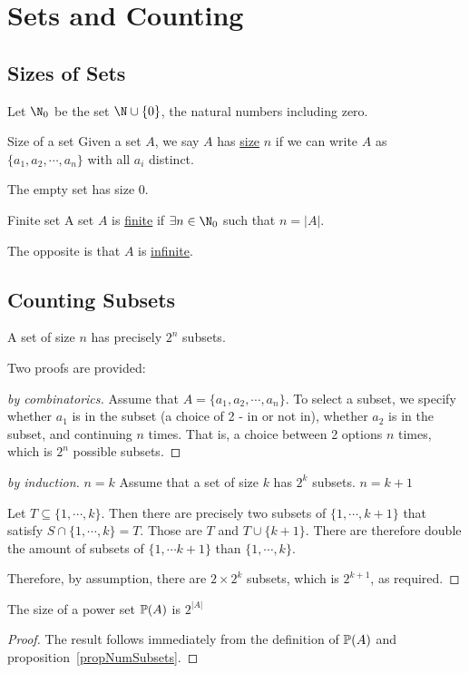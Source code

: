 \documentclass[../Main.tex]{subfiles}
\begin{document}
\section{Sets and Counting}
\subsection{Sizes of Sets}
Let $\N_0$ be the set $\N \cup \{0\}$, the natural numbers including zero.
\begin{definition}{Size of a set}
    Given a set $A$, we say $A$ has \underline{size} $n$ if we can write $A$ as $\{a_1, a_2, \cdots, a_n\}$ with all $a_i$ distinct.
\end{definition}
The empty set has size $0$.
\begin{definition}{Finite set}
    A set $A$ is \underline{finite} if $\exists n \in \N_0$ such that $n = |A|$.
\end{definition}
The opposite is that $A$ is \underline{infinite}.\par
\subsection{Counting Subsets}
\begin{proposition}
    A set of size $n$ has precisely $2^n$ subsets.
    \label{propNumSubsets}
\end{proposition}
Two proofs are provided:
\begin{proof}[by combinatorics]
    Assume that $A = \{a_1, a_2, \cdots, a_n\}$. To select a subset, we specify whether $a_1$ is in the subset (a choice of 2 - in or not in), whether $a_2$ is in the subset, and continuing $n$ times. That is, a choice between 2 options $n$ times, which is $2^n$ possible subsets.
\end{proof}
\begin{proof}[by induction]
    {$n=k$}{
        Assume that a set of size $k$ has $2^k$ subsets.
    }
    {$n = k + 1$}{
        Let $T \subseteq \{1, \cdots, k\}$. Then there are precisely two subsets of $\{1, \cdots, k + 1\}$ that satisfy $S \cap \{1, \cdots, k\} = T$. Those are $T$ and $T \cup \{k + 1\}$. There are therefore double the amount of subsets of $\{1, \cdots k+1\}$ than $\{1, \cdots, k\}$.\par
        Therefore, by assumption, there are $2 \times 2^k$ subsets, which is $2^{k+1}$, as required.
    }
\end{proof}
\begin{corollary}
    The size of a power set $\mathbb{P}(A)$ is $2^{|A|}$
    \label{corSizePowerSet}
\end{corollary}
\begin{proof}
    The result follows immediately from the definition of $\mathbb{P}(A)$ and proposition~\ref{propNumSubsets}.
\end{proof}
\end{document}
